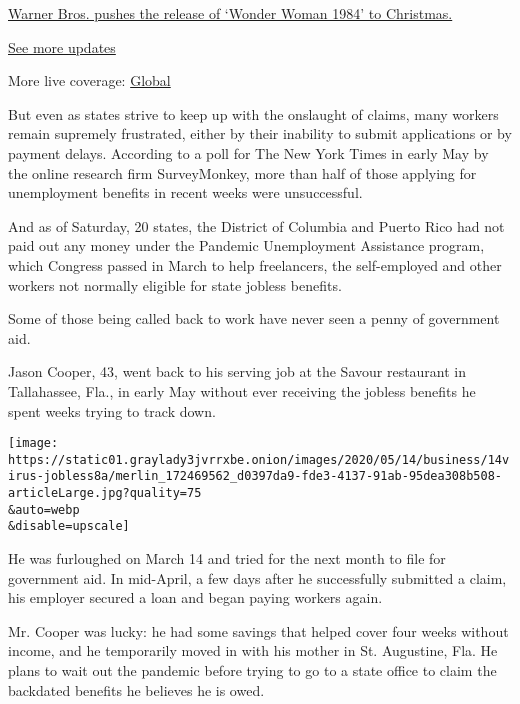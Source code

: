 \href{https://www.nytimes3xbfgragh.onion/live/2020/09/11/business/stock-market-today-coronavirus?action=click\&pgtype=Article\&state=default\&region=MAIN_CONTENT_1\&context=storylines_live_updates\#warner-bros-pushes-the-release-of-wonder-woman-1984-to-christmas}{Warner
Bros. pushes the release of `Wonder Woman 1984' to Christmas.}

\href{https://www.nytimes3xbfgragh.onion/live/2020/09/11/business/stock-market-today-coronavirus?action=click\&pgtype=Article\&state=default\&region=MAIN_CONTENT_1\&context=storylines_live_updates}{See
more updates}

More live coverage:
\href{https://www.nytimes3xbfgragh.onion/2020/09/11/world/covid-19-coronavirus.html?action=click\&pgtype=Article\&state=default\&region=MAIN_CONTENT_1\&context=storylines_live_updates}{Global}

But even as states strive to keep up with the onslaught of claims, many
workers remain supremely frustrated, either by their inability to submit
applications or by payment delays. According to a poll for The New York
Times in early May by the online research firm SurveyMonkey, more than
half of those applying for unemployment benefits in recent weeks were
unsuccessful.

And as of Saturday, 20 states, the District of Columbia and Puerto Rico
had not paid out any money under the Pandemic Unemployment Assistance
program, which Congress passed in March to help freelancers, the
self-employed and other workers not normally eligible for state jobless
benefits.

Some of those being called back to work have never seen a penny of
government aid.

Jason Cooper, 43, went back to his serving job at the Savour restaurant
in Tallahassee, Fla., in early May without ever receiving the jobless
benefits he spent weeks trying to track down.

\texttt{[image: https://static01.graylady3jvrrxbe.onion/images/2020/05/14/business/14virus-jobless8a/merlin\_172469562\_d0397da9-fde3-4137-91ab-95dea308b508-articleLarge.jpg?quality=75\\\&auto=webp\\\&disable=upscale]}

He was furloughed on March 14 and tried for the next month to file for
government aid. In mid-April, a few days after he successfully submitted
a claim, his employer secured a loan and began paying workers again.

Mr. Cooper was lucky: he had some savings that helped cover four weeks
without income, and he temporarily moved in with his mother in St.
Augustine, Fla. He plans to wait out the pandemic before trying to go to
a state office to claim the backdated benefits he believes he is owed.

